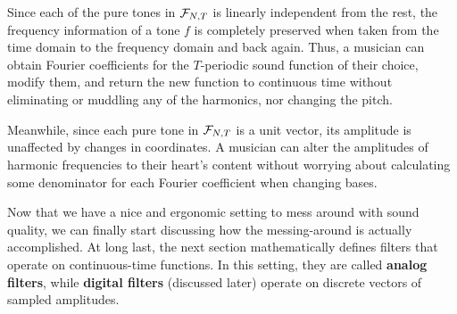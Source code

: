 \par \bigskip Since each of the pure tones in $\mathcal{F}_{N,T}$ is linearly independent from the rest, the frequency information of a tone $f$ is completely preserved when taken from the time domain to the frequency domain and back again. Thus, a musician can obtain Fourier coefficients for the $T$-periodic sound function of their choice, modify them, and return the new function to continuous time without eliminating or muddling any of the harmonics, nor changing the pitch.

\par \bigskip Meanwhile, since each pure tone in $\mathcal{F}_{N,T}$ is a unit vector, its amplitude is unaffected by changes in coordinates. A musician can alter the amplitudes of harmonic frequencies to their heart's content without worrying about calculating some denominator for each Fourier coefficient when changing bases.

\par \bigskip Now that we have a nice and ergonomic setting to mess around with sound quality, we can finally start discussing how the messing-around is actually accomplished. At long last, the next section mathematically defines filters that operate on continuous-time functions. In this setting, they are called \textbf{analog filters}, while \textbf{digital filters} (discussed later) operate on discrete vectors of sampled amplitudes.